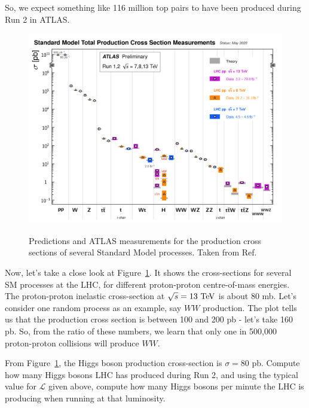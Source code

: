 So, we expect something like 116 million top pairs to have been produced during Run 2 in ATLAS. 

\begin{figure}[tb] 
	\centering
	\includegraphics[width=0.7\columnwidth]{Figures/SM_summary.png}
	\label{fig:SM_summary}
	\caption{Predictions and ATLAS measurements for the production cross sections of several Standard Model processes. Taken from Ref.~\cite{SM_summary}}
\end{figure}

Now, let's take a close look at Figure~\ref{fig:SM_summary}. It shows the cross-sections for several SM processes at the LHC, for different proton-proton centre-of-mass energies. The proton-proton inelastic cross-section at $\sqrt{s} = 13\ \TeV$ is about $80$ mb. Let's consider one random process as an example, say $WW$ production. The plot tells us that the production cross section is between 100 and 200 pb - let's take 160 pb. So, from the ratio of these numbers, we learn that only one in 500,000 proton-proton collisions will produce $WW$. 

\begin{mybox}
\begin{ExerciseList}
\Exercise From Figure~\ref{fig:SM_summary}, the Higgs boson production cross-section is $\sigma = 80$ pb. Compute how many Higgs bosons LHC has produced during Run 2, and using the typical value for $\mathcal{L}$ given above, compute how many Higgs bosons per minute the LHC is producing when running at that luminosity. 
\end{ExerciseList}
\end{mybox}
